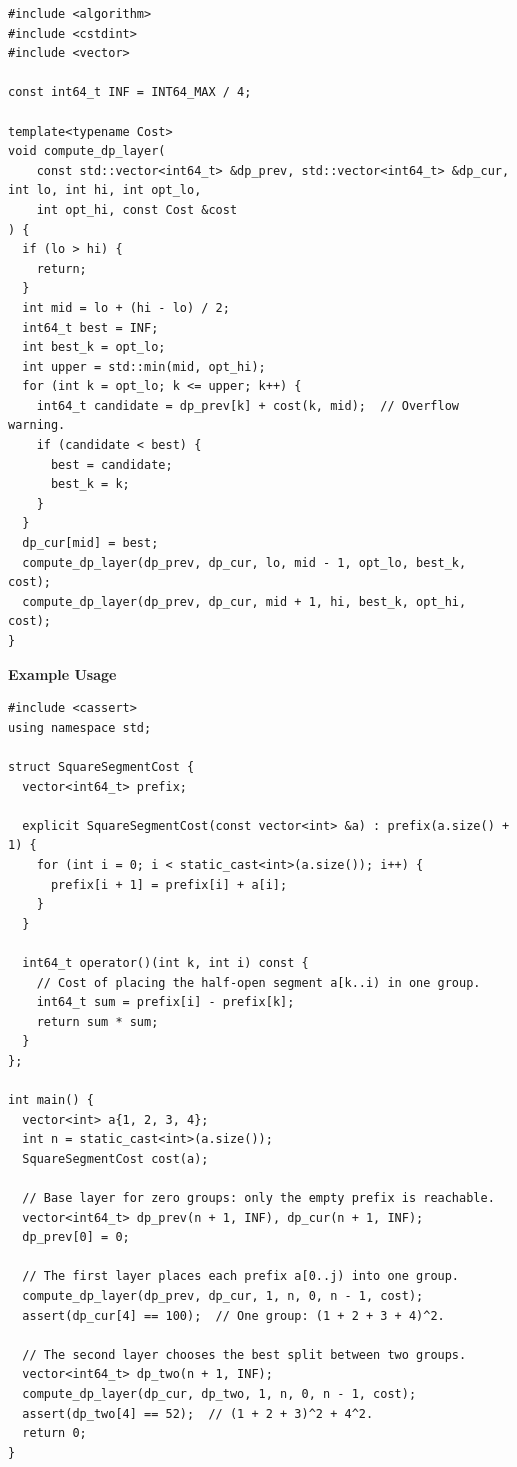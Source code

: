 \begin{lstlisting}[style=cpp]
#include <algorithm>
#include <cstdint>
#include <vector>

const int64_t INF = INT64_MAX / 4;

template<typename Cost>
void compute_dp_layer(
    const std::vector<int64_t> &dp_prev, std::vector<int64_t> &dp_cur, int lo, int hi, int opt_lo,
    int opt_hi, const Cost &cost
) {
  if (lo > hi) {
    return;
  }
  int mid = lo + (hi - lo) / 2;
  int64_t best = INF;
  int best_k = opt_lo;
  int upper = std::min(mid, opt_hi);
  for (int k = opt_lo; k <= upper; k++) {
    int64_t candidate = dp_prev[k] + cost(k, mid);  // Overflow warning.
    if (candidate < best) {
      best = candidate;
      best_k = k;
    }
  }
  dp_cur[mid] = best;
  compute_dp_layer(dp_prev, dp_cur, lo, mid - 1, opt_lo, best_k, cost);
  compute_dp_layer(dp_prev, dp_cur, mid + 1, hi, best_k, opt_hi, cost);
}
\end{lstlisting}
\textbf{Example Usage}\par
\begin{lstlisting}[style=cpp]
#include <cassert>
using namespace std;

struct SquareSegmentCost {
  vector<int64_t> prefix;

  explicit SquareSegmentCost(const vector<int> &a) : prefix(a.size() + 1) {
    for (int i = 0; i < static_cast<int>(a.size()); i++) {
      prefix[i + 1] = prefix[i] + a[i];
    }
  }

  int64_t operator()(int k, int i) const {
    // Cost of placing the half-open segment a[k..i) in one group.
    int64_t sum = prefix[i] - prefix[k];
    return sum * sum;
  }
};

int main() {
  vector<int> a{1, 2, 3, 4};
  int n = static_cast<int>(a.size());
  SquareSegmentCost cost(a);

  // Base layer for zero groups: only the empty prefix is reachable.
  vector<int64_t> dp_prev(n + 1, INF), dp_cur(n + 1, INF);
  dp_prev[0] = 0;

  // The first layer places each prefix a[0..j) into one group.
  compute_dp_layer(dp_prev, dp_cur, 1, n, 0, n - 1, cost);
  assert(dp_cur[4] == 100);  // One group: (1 + 2 + 3 + 4)^2.

  // The second layer chooses the best split between two groups.
  vector<int64_t> dp_two(n + 1, INF);
  compute_dp_layer(dp_cur, dp_two, 1, n, 0, n - 1, cost);
  assert(dp_two[4] == 52);  // (1 + 2 + 3)^2 + 4^2.
  return 0;
}
\end{lstlisting}
